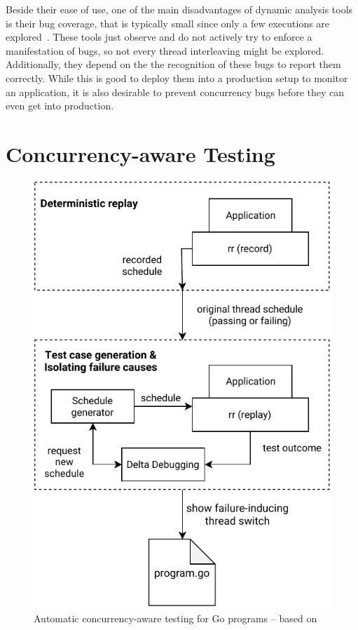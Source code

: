 \documentclass[conference]{IEEEtran}
\begin{document}
Beside their ease of use, one of the main disadvantages of dynamic analysis tools is their bug coverage, that is typically small since only a few executions are explored~\cite{qadeer2004kiss}.
These tools just observe and do not actively try to enforce a manifestation of bugs, so not every thread interleaving might be explored.
Additionally, they depend on the the recognition of these bugs to report them correctly.
While this is good to deploy them into a production setup to monitor an application, it is also desirable to prevent concurrency bugs before they can even get into production.


\section{Concurrency-aware Testing}
\label{sct:testing}

\begin{figure}
    \includegraphics[width=\linewidth]{figures/Concurrency-Testing.pdf}
    \caption{Automatic concurrency-aware testing for Go programs -- based on\cite{acm2002}}
    \label{fig:testing}
\end{figure}
\end{document}
